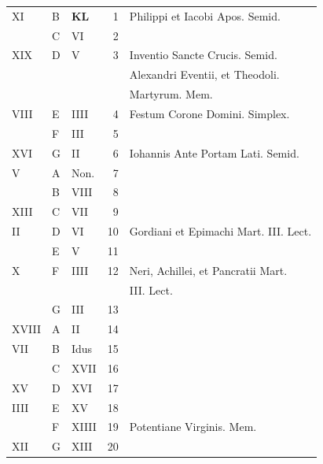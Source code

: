 \begin{center}
\begin{tabular}{l | l | l | r | l l}
\color{Red} XI & B & \textbf{\color{Red} K\color{Blue}L} & 1 & Philippi et Iacobi Apos. Semid. \\
\color{Red}  & C & \color{Red} VI & 2 & \\
\color{Red} XIX & D & \color{Red} V & 3 & Inventio Sancte Crucis. Semid. \\
 &  &  &  & \multicolumn{2}{l}{\quad Alexandri Eventii, et Theodoli.} \\
 &  &  &  & \quad \color{Red} Martyrum. \color{black} Mem. \\
\color{Red} VIII & E & \color{Red} IIII & 4 & Festum Corone Domini. Simplex. & \color{Red} \\
\color{Red}  & F & \color{Red} III & 5 & & \color{Red} \\
\color{Red} XVI & G & \color{Red} II & 6 & \color{Red} Iohannis Ante Portam Lati. Semid. \\
\color{Red} V & \color{Red} A & \color{Red} Non. & 7 & & \color{Red} \\
\color{Red}  & B & \color{Red} VIII & 8 & & \color{Red} \\
\color{Red} XIII & C & \color{Red} VII & 9 & & \color{Red} \\
\color{Red} II & D & \color{Red} VI & 10 & \multicolumn{2}{l}{Gordiani et Epimachi Mart. III. Lect.} \color{Red} \\
\color{Red}  & E & \color{Red} V & 11 & & \color{Red} \\
\color{Red} X & F & \color{Red} IIII & 12 & \multicolumn{2}{l}{Neri, Achillei, et Pancratii Mart.} \\
 &  &  &  & \quad III. Lect. \color{Red} \\
\color{Red}  & G & \color{Red} III & 13 & & \color{Red} \\
\color{Red} XVIII & \color{Red} A & \color{Red} II & 14 & & \color{Red} \\
\color{Red} VII & B & \color{Red} Idus & 15 & & \color{Red} \\
\color{Red}  & C & \color{Red} XVII & 16 &  & \color{Red} \\
\color{Red} XV & D & \color{Red} XVI & 17 & & \color{Red} \\
\color{Red} IIII & E & \color{Red} XV & 18 & \\
\color{Red}  & F & \color{Red} XIIII & 19 & Potentiane Virginis. Mem. & \color{Red} \\
\color{Red} XII & G & \color{Red} XIII & 20 & & \color{Red} \\

\end{tabular}
\end{center}

